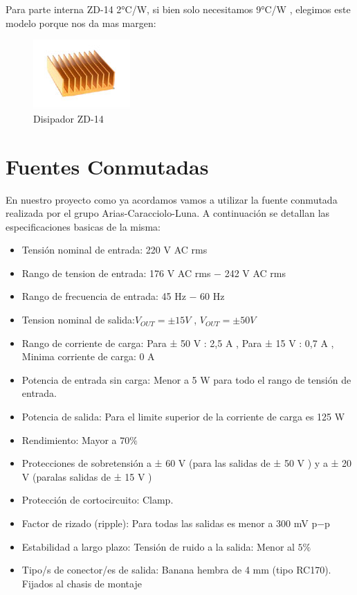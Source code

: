 \documentclass[a4paper,12pt,twoside]{article}
\begin{document}
Para parte interna ZD-14 2°C/W, si bien solo necesitamos 9°C/W , elegimos este modelo porque nos da mas margen:

\begin{figure}[H]
    \centering
    \includegraphics[height=0.4\textwidth]{img/zd14.jpg}
    \caption{Disipador ZD-14}
    \label{fig:diszd14}
\end{figure}

\section{Fuentes Conmutadas}

En nuestro proyecto como ya acordamos vamos a utilizar la fuente conmutada realizada por el grupo Arias-Caracciolo-Luna.
A continuación se detallan las especificaciones basicas de la misma:

\begin{itemize}
\item{Tensión nominal de entrada: 220 V AC rms}
\item{Rango de tension de entrada: 176 V AC rms − 242 V AC rms}
\item{Rango de frecuencia de entrada: 45 Hz − 60 Hz}
\item{Tension nominal de salida:$ V_{OUT} = ± 15 V$ , $V_{OUT} = ± 50 V$}
\item{Rango de corriente de carga: Para ± 50 V : 2,5 A , Para ± 15 V : 0,7 A , Minima corriente de carga: 0 A}
\item{Potencia de entrada sin carga: Menor a 5 W para todo el rango de tensión de entrada.}
\item{Potencia de salida: Para el limite superior de la corriente de carga es 125 W}
\item{Rendimiento: Mayor a $70\%$}
\item{Protecciones de sobretensión a ± 60 V (para las salidas de ± 50 V ) y a ± 20 V (paralas salidas de ± 15 V )}
\item{Protección de cortocircuito: Clamp.}
\item{Factor de rizado (ripple): Para todas las salidas es menor a 300 mV p−p}
\item{Estabilidad a largo plazo: Tensión de ruido a la salida: Menor al $5\%$}
\item{Tipo/s de conector/es de salida: Banana hembra de 4 mm  (tipo RC170). Fijados al chasis de montaje}
\end{itemize}
\end{document}
